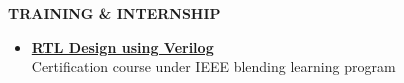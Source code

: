 \documentclass[a4paper]{article}
\begin{document}
	\begin{flushleft}
		\vspace{5mm}
		\large{\textbf{TRAINING \& INTERNSHIP }} 
		\vspace{0.5mm}
		\noindent\hrulefill
		\vspace{0.5mm}
	\end{flushleft}
	\begin{itemize}
		\item \href{https://blended-learning.ieee.org/BLPLMS/CL21/ProgramCertificate.aspx?ProductId=129&UserId=3148}{\textbf{RTL Design using Verilog}}	\\
					Certification course under IEEE blending learning program              
	\end{itemize}
\end{document}
